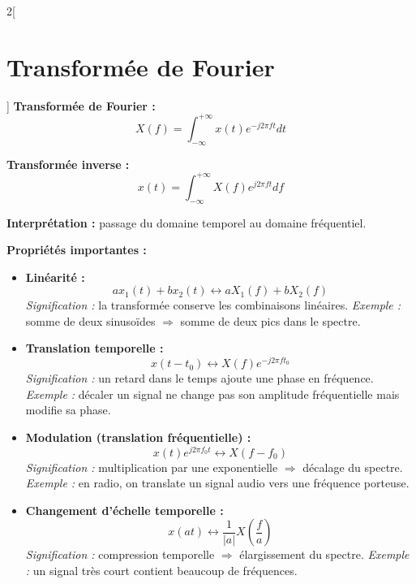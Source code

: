 \documentclass[a4paper,10pt]{article}
\begin{document}
    \begin{multicols}{2}[
    \section{Transformée de Fourier}
    ]
        \textbf{Transformée de Fourier :}
        \[
        X(f) = \int_{-\infty}^{+\infty} x(t) e^{-j2\pi ft} dt
        \]

        \textbf{Transformée inverse :}
        \[
        x(t) = \int_{-\infty}^{+\infty} X(f) e^{j2\pi ft} df
        \]

        \textbf{Interprétation :} passage du domaine temporel au domaine fréquentiel.

        \textbf{Propriétés importantes :}

        \begin{itemize}
            \item \textbf{Linéarité :}
            \[
            a x_1(t) + b x_2(t) \longleftrightarrow a X_1(f) + b X_2(f)
            \]
            \textit{Signification :} la transformée conserve les combinaisons linéaires.  
            \textit{Exemple :} somme de deux sinusoïdes $\Rightarrow$ somme de deux pics dans le spectre.

            \item \textbf{Translation temporelle :}
            \[
            x(t - t_0) \longleftrightarrow X(f)e^{-j2\pi f t_0}
            \]
            \textit{Signification :} un retard dans le temps ajoute une phase en fréquence.  
            \textit{Exemple :} décaler un signal ne change pas son amplitude fréquentielle mais modifie sa phase.

            \item \textbf{Modulation (translation fréquentielle) :}
            \[
            x(t)e^{j2\pi f_0 t} \longleftrightarrow X(f - f_0)
            \]
            \textit{Signification :} multiplication par une exponentielle $\Rightarrow$ décalage du spectre.  
            \textit{Exemple :} en radio, on translate un signal audio vers une fréquence porteuse.

            \item \textbf{Changement d'échelle temporelle :}
            \[
            x(at) \longleftrightarrow \frac{1}{|a|}X\left(\frac{f}{a}\right)
            \]
            \textit{Signification :} compression temporelle $\Rightarrow$ élargissement du spectre.  
            \textit{Exemple :} un signal très court contient beaucoup de fréquences.


\end{itemize}
\end{multicols}
\end{document}
